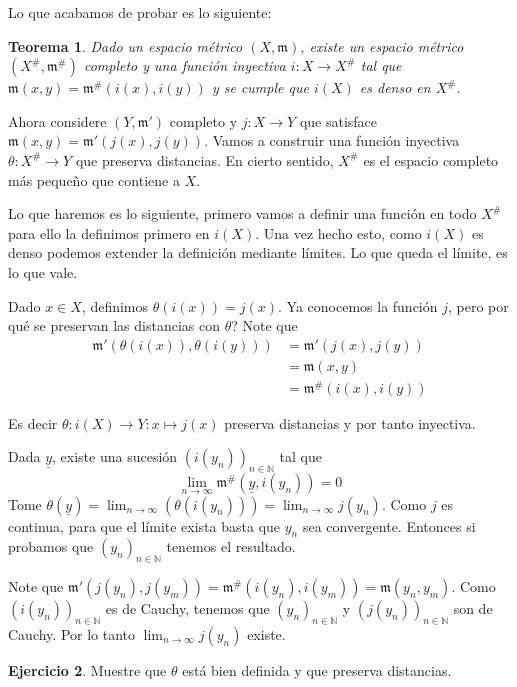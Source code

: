 \documentclass[12pt]{article}
\theoremstyle{plain}
\newtheorem{Th}{Teorema}[subsection]   %
\theoremstyle{definition}
\newtheorem{Ej}[Th]{Ejercicio}
\theoremstyle{remark}
\numberwithin{equation}{section}
\newcommand{\bN}{\mathbb{N}}        %
\newcommand{\mm}{\mathfrak{m}}      %
\renewcommand{\:}{\colon}           %
\begin{document}
\begin{multicols}{2}
\begin{ptcb}

\end{ptcb}

Lo que acabamos de probar es lo siguiente:
\begin{Th}
  Dado un espacio métrico $(X,\mm)$, existe un espacio métrico $(X^\#,\mm^\#)$ completo y una función inyectiva $i\colon X\to X^\#$ tal que $\mm(x,y)=\mm^\#(i(x),i(y))$ y se cumple que $i(X)$ es denso en $X^\#$.
\end{Th}
Ahora considere $(Y,\mm')$ completo y $j\colon X\to Y$ que satisface $\mm(x,y)=\mm'(j(x),j(y))$. Vamos a construir una función inyectiva $\theta\colon X^\#\to Y$ que preserva distancias. En cierto sentido, $X^\#$ es el espacio completo más pequeño que contiene a $X$.\par
Lo que haremos es lo siguiente, primero vamos a definir una función en todo $X^\#$ para ello la definimos primero en $i(X)$. Una vez hecho esto, como $i(X)$ es denso podemos extender la definición mediante límites. Lo que queda el límite, es lo que vale.
\begin{ptcbp}
Dado $x\in X$, definimos $\theta(i(x))=j(x)$. Ya conocemos la función $j$, pero por qué se preservan las distancias con $\theta$? Note que
\begin{align*}
\mm'(\theta(i(x)),\theta(i(y)))  &=\mm'(j(x),j(y))\\
   &=\mm(x,y)  \\
   &=\mm^\#(i(x),i(y))
\end{align*}

Es decir $\theta\colon i(X)\to Y\colon x\mapsto j(x)$ preserva distancias y por tanto inyectiva. \par
Dada $\underline{y}$, existe una sucesión $(i(y_n))_{n\in\bN}$ tal que
$$\lim_{n\to\infty}\mm^\#(\underline{y},i(y_n))=0$$
Tome $\theta(\underline{y})=\lim_{n\to\infty}(\theta(i(y_n)))=\lim_{n\to\infty}j(y_n)$. Como $j$ es continua, para que el límite exista basta que $y_n$ sea convergente. Entonces si probamos que $(y_n)_{n\in\bN}$ tenemos el resultado.\par
Note que $\mm'(j(y_n),j(y_m))=\mm^\#(i(y_n),i(y_m))=\mm(y_n,y_m)$. Como $(i(y_n))_{n\in\bN}$ es de Cauchy, tenemos que $(y_n)_{n\in\bN}$ y $(j(y_n))_{n\in\bN}$ son de Cauchy. Por lo tanto $\lim_{n\to\infty}j(y_n)$ existe.
\end{ptcbp}

\begin{Ej}
Muestre que $\theta$ está bien definida y que preserva distancias.
\end{Ej}


\end{multicols}
\end{document}
